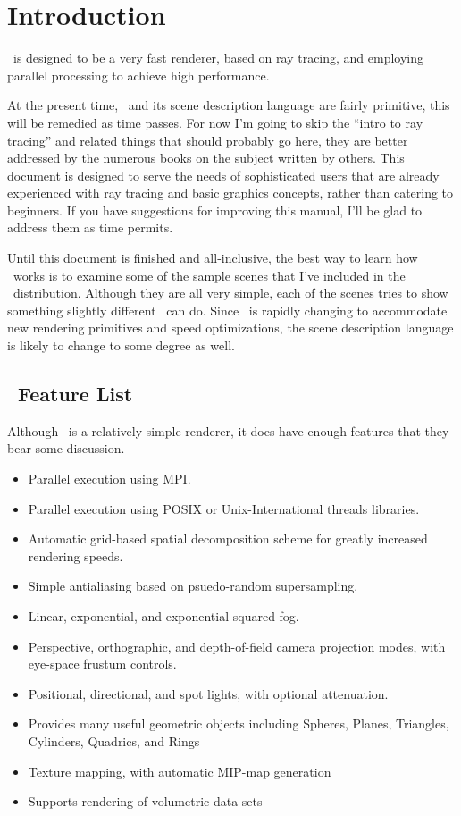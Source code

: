 \section{Introduction}
\RAY\ is designed to be a very fast renderer, based on ray tracing,
and employing parallel processing to achieve high performance.

At the present time, \RAY\ and its scene description language are fairly
primitive, this will be remedied as time passes.  For now I'm going to 
skip the ``intro to ray tracing'' and related things that should probably 
go here, they are better addressed by the numerous books on the subject
written by others.  This document is designed to serve the needs of 
sophisticated users that are already experienced with ray tracing
and basic graphics concepts, rather than catering to beginners.  
If you have suggestions for improving this manual, I'll be glad 
to address them as time permits.

Until this document is finished and all-inclusive, the best way to 
learn how \RAY\ works is to examine some of the sample scenes that 
I've included in the \RAY\ distribution.  Although they are all very 
simple, each of the scenes tries to show something slightly 
different \RAY\ can do.  Since \RAY\ is rapidly changing to accommodate 
new rendering primitives and speed optimizations, the scene 
description language is likely to change to some degree as well. 

\subsection{\RAY\ Feature List}
  Although \RAY\ is a relatively simple renderer, it does have enough 
features that they bear some discussion.

\begin{itemize}
\item Parallel execution using MPI.
\item Parallel execution using POSIX or Unix-International 
      threads libraries.
\item Automatic grid-based spatial decomposition scheme for greatly
      increased rendering speeds.
\item Simple antialiasing based on psuedo-random supersampling.
\item Linear, exponential, and exponential-squared fog.
\item Perspective, orthographic, and depth-of-field camera projection
      modes, with eye-space frustum controls.
\item Positional, directional, and spot lights, with optional attenuation.
\item Provides many useful geometric objects including 
      Spheres, Planes, Triangles, Cylinders, Quadrics, and Rings
\item Texture mapping, with automatic MIP-map generation
\item Supports rendering of volumetric data sets 
\end{itemize}


